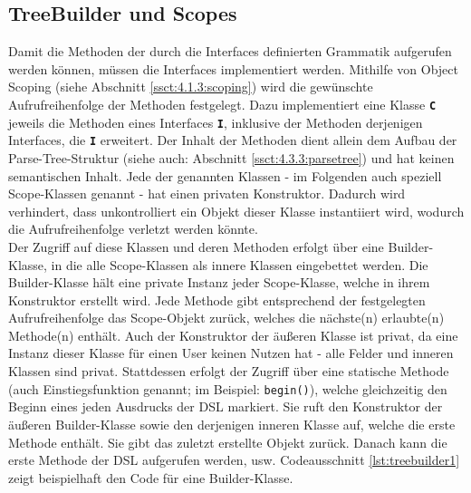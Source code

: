 \subsection{TreeBuilder und Scopes}\label{ssct:4.3.2:treebuilder}
Damit die Methoden der durch die Interfaces definierten Grammatik aufgerufen werden können, müssen die Interfaces implementiert werden. Mithilfe von Object Scoping (siehe Abschnitt \ref{ssct:4.1.3:scoping}) wird die gewünschte Aufrufreihenfolge der Methoden festgelegt. Dazu implementiert eine Klasse \textbf{\texttt{C}} jeweils die Methoden eines Interfaces \textbf{\texttt{I}}, inklusive der Methoden derjenigen Interfaces, die \textbf{\texttt{I}} erweitert. Der Inhalt der Methoden dient allein dem Aufbau der Parse-Tree-Struktur (siehe auch: Abschnitt \ref{ssct:4.3.3:parsetree}) und hat keinen semantischen Inhalt. Jede der genannten Klassen - im Folgenden auch speziell Scope-Klassen genannt - hat einen privaten Konstruktor. Dadurch wird verhindert, dass unkontrolliert ein Objekt dieser Klasse instantiiert wird, wodurch die Aufrufreihenfolge verletzt werden könnte.\\
Der Zugriff auf diese Klassen und deren Methoden erfolgt über eine Builder-Klasse, in die alle Scope-Klassen als innere Klassen eingebettet werden. Die Builder-Klasse hält eine private Instanz jeder Scope-Klasse, welche in ihrem Konstruktor erstellt wird. Jede Methode gibt entsprechend der festgelegten Aufrufreihenfolge das Scope-Objekt zurück, welches die nächste(n) erlaubte(n) Methode(n) enthält. Auch der Konstruktor der äußeren Klasse ist privat, da eine Instanz dieser Klasse für einen User keinen Nutzen hat - alle Felder und inneren Klassen sind privat. Stattdessen erfolgt der Zugriff über eine statische Methode (auch Einstiegsfunktion genannt; im Beispiel: \texttt{begin()}), welche gleichzeitig den Beginn eines jeden Ausdrucks der DSL markiert. Sie ruft den Konstruktor der äußeren Builder-Klasse sowie den derjenigen inneren Klasse auf, welche die erste Methode enthält. Sie gibt das zuletzt erstellte Objekt zurück. Danach kann die erste Methode der DSL aufgerufen werden, usw. Codeausschnitt \ref{lst:treebuilder1} zeigt beispielhaft den Code für eine Builder-Klasse.

